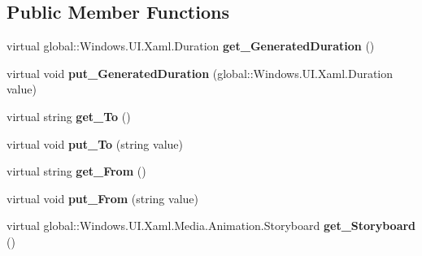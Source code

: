 \subsection*{Public Member Functions}
\begin{DoxyCompactItemize}
\item 
\mbox{\label{class_windows_1_1_u_i_1_1_xaml_1_1_visual_transition_afb0659e34cd42d916c1086d04558a288}} 
virtual global\+::\+Windows.\+U\+I.\+Xaml.\+Duration {\bfseries get\+\_\+\+Generated\+Duration} ()
\item 
\mbox{\label{class_windows_1_1_u_i_1_1_xaml_1_1_visual_transition_a9425580c95693c7ee3d33464e68ce83f}} 
virtual void {\bfseries put\+\_\+\+Generated\+Duration} (global\+::\+Windows.\+U\+I.\+Xaml.\+Duration value)
\item 
\mbox{\label{class_windows_1_1_u_i_1_1_xaml_1_1_visual_transition_a0b343e8c15ba3f404cb2f2152e2af0fb}} 
virtual string {\bfseries get\+\_\+\+To} ()
\item 
\mbox{\label{class_windows_1_1_u_i_1_1_xaml_1_1_visual_transition_aa76ac64a1c186e375fd07fbef846cefd}} 
virtual void {\bfseries put\+\_\+\+To} (string value)
\item 
\mbox{\label{class_windows_1_1_u_i_1_1_xaml_1_1_visual_transition_a9aa7c36d0dc60308cfeda62679c8e084}} 
virtual string {\bfseries get\+\_\+\+From} ()
\item 
\mbox{\label{class_windows_1_1_u_i_1_1_xaml_1_1_visual_transition_af379d21f8a469ce2c38b93f7b387d5f3}} 
virtual void {\bfseries put\+\_\+\+From} (string value)
\item 
\mbox{\label{class_windows_1_1_u_i_1_1_xaml_1_1_visual_transition_ad0e85cd4965feb0bae3084eee6e188dc}} 
virtual global\+::\+Windows.\+U\+I.\+Xaml.\+Media.\+Animation.\+Storyboard {\bfseries get\+\_\+\+Storyboard} ()
\item 
\mbox{\label{class_windows_1_1_u_i_1_1_xaml_1_1_visual_transition_a84345f3db3f81606783b0b0f12f011dd}} 

\end{DoxyCompactItemize}
